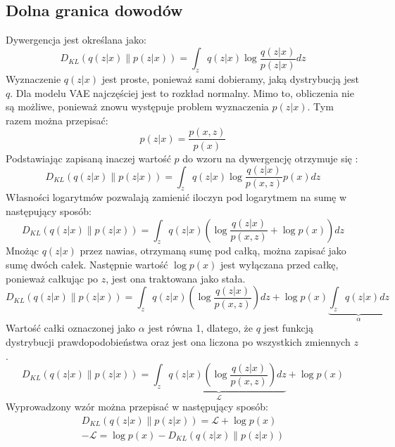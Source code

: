 \documentclass[a4paper,12pt,oneside]{book} %
\begin{document}
\subsection{Dolna granica dowodów}
Dywergencja jest określana jako:
\begin{equation}
	D_{KL}(q(z|x)\|p(z|x))=\displaystyle\int_{z}^{}q(z|x)\log\frac{q(z|x)}{p(z|x)}dz
	\label{kld1}
\end{equation}
Wyznaczenie $q(z|x)$ jest proste, ponieważ sami dobieramy, jaką dystrybucją jest $q$. Dla modelu VAE najczęściej jest to rozkład normalny. Mimo to, obliczenia nie są możliwe, ponieważ znowu występuje problem wyznaczenia $p(z|x)$. Tym razem można przepisać:
\begin{equation}
	p(z|x)=\dfrac{p(x,z)}{p(x)}
	\label{bayesinaczej}
\end{equation}
Podstawiając zapisaną inaczej wartość $p$ do wzoru na dywergencję otrzymuje się \cite{filmik1}:
\begin{equation}
	D_{KL}(q(z|x)\|p(z|x))=\displaystyle\int_{z}^{}q(z|x)\log\frac{q(z|x)}{p(x,z)}p(x)dz
	\label{kldlogarytmy}
\end{equation}
Własności logarytmów pozwalają zamienić iloczyn pod logarytmem na sumę w następujący sposób:
\begin{equation}
	D_{KL}(q(z|x)\|p(z|x))=\displaystyle\int_{z}^{}q(z|x)\left( \log\frac{q(z|x)}{p(x,z)} + \log p(x)\right) dz
	\label{kldcalka}
\end{equation}
Mnożąc $q(z|x)$ przez nawias, otrzymaną sumę pod całką, można zapisać jako sumę dwóch całek. Następnie wartość $\log p(x)$ jest wyłączana przed całkę, ponieważ całkując po $z$, jest ona traktowana jako stała.
\begin{equation}
	D_{KL}(q(z|x)\|p(z|x))=\displaystyle\int_{z}^{}q(z|x)\left( \log\frac{q(z|x)}{p(x,z)}\right)dz + \log p(x)\underbrace{\displaystyle\int_{z}^{}q(z|x)dz}_{\text{$\alpha$}}
	\label{calkaalpha}
\end{equation}
Wartość całki oznaczonej jako $\alpha$ jest równa 1, dlatego, że $q$ jest funkcją dystrybucji prawdopodobieństwa oraz jest ona liczona po wszystkich zmiennych $z$.
\begin{equation}
	D_{KL}(q(z|x)\|p(z|x))=\underbrace{\displaystyle\int_{z}^{}q(z|x)\left( \log\frac{q(z|x)}{p(x,z)}\right)dz}_{\text{$\mathcal{L}$}} + \log p(x)
	\label{kldfinal}
\end{equation}
Wyprowadzony wzór można przepisać w następujący sposób:
\begin{equation}\label{elbo}
	\begin{array}{rcl}
		D_{KL}(q(z|x)\|p(z|x))= \mathcal{L} + \log p(x)\\[1ex]
	-\mathcal{L} = \log p(x) - D_{KL}(q(z|x)\|p(z|x))
	\end{array}
\end{equation}
\end{document}
